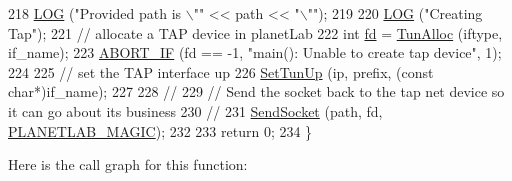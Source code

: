 \begin{DoxyCode}
218   \hyperlink{creator-utils_8h_a158a8c64f24645c7478298399825737f}{LOG} (\textcolor{stringliteral}{"Provided path is \(\backslash\)""} << path << \textcolor{stringliteral}{"\(\backslash\)""});
219 
220   \hyperlink{creator-utils_8h_a158a8c64f24645c7478298399825737f}{LOG} (\textcolor{stringliteral}{"Creating Tap"});
221   \textcolor{comment}{// allocate a TAP device in planetLab}
222   \textcolor{keywordtype}{int} \hyperlink{lte_2model_2fading-traces_2fading__trace__generator_8m_a44f21d5190b5a6df8089f54799628d7e}{fd} = \hyperlink{planetlab-tap-creator_8cc_a0a931600f9ea85f6e43637c1a1d3eb20}{TunAlloc} (iftype, if\_name);
223   \hyperlink{creator-utils_8h_a91c11c90ad2f1672fbd3c031038dce16}{ABORT\_IF} (fd == -1, \textcolor{stringliteral}{"main(): Unable to create tap device"}, 1);
224 
225   \textcolor{comment}{// set the TAP interface up}
226   \hyperlink{planetlab-tap-creator_8cc_a237884a4f069a5e614fdb20b95dd1964}{SetTunUp} (ip, prefix, (\textcolor{keyword}{const} \textcolor{keywordtype}{char}*)if\_name);
227 
228   \textcolor{comment}{//}
229   \textcolor{comment}{// Send the socket back to the tap net device so it can go about its business}
230   \textcolor{comment}{//}
231   \hyperlink{tap-creator_8cc_a11a114b8401a27939e87a94ade65213a}{SendSocket} (path, fd, \hyperlink{planetlab-tap-creator_8cc_a15008ade4323f5ef598ad5a66b141e42}{PLANETLAB\_MAGIC});
232 
233   \textcolor{keywordflow}{return} 0;
234 \}
\end{DoxyCode}


Here is the call graph for this function\+:


